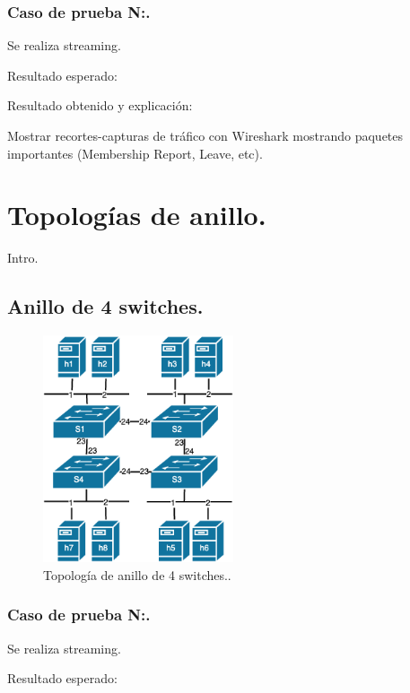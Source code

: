 \documentclass[12pt,a4paper,oneside]{book}
\begin{document}
\subsubsection{Caso de prueba N:.} 
Se realiza streaming.

\vspace{0.5cm}
Resultado esperado: 

\vspace{0.5cm}
Resultado obtenido y explicación: 

\vspace{0.5cm}
Mostrar recortes-capturas de tráfico con Wireshark mostrando paquetes importantes (Membership Report, Leave, etc).

\section{Topologías de anillo.}

Intro.

\subsection{Anillo de 4 switches.}


\begin{figure}[ht]
 \centering
 \includegraphics[width=0.5\textwidth]{fotos/5_Pruebas/3_topo_anillo/simple.png}
 \caption{Topología de anillo de 4 switches..}
 \label{anillo_simple}
\end{figure}

\subsubsection{Caso de prueba N:.} 
Se realiza streaming.

\vspace{0.5cm}
Resultado esperado: 
\end{document}
